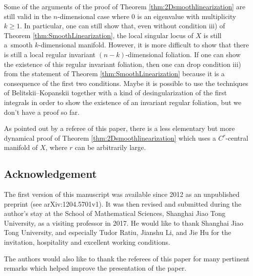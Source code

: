 \documentclass[pdftex]{sigma}
\numberwithin{equation}{section}
\begin{document}
\begin{Remark}
Some of the arguments of the proof of Theorem \ref{thm:2Dsmoothlinearization} are still valid in the $n$-dimensional
case where 0 is an eigenvalue with multiplicity $k \geq 1$. In particular, one can still show that, even without condition iii)
of Theorem \ref{thm:SmoothLinearization}, the local singular locus of $X$ is still a~smooth $k$-dimensional manifold. However,
it is more dif\/f\/icult to show that there is still a local regular invariant $(n-k)$-dimensional foliation. If one can show the existence
of this regular invariant foliation, then one can drop condition iii) from the statement of
Theorem \ref{thm:SmoothLinearization} because it is a consequence of the f\/irst two conditions. Maybe it is possible to use
 the techniques of Belitskii--Kopanskii \cite{BK-Equivariant2002} together with a kind of desingularization of the f\/irst
integrals in order to show the existence of an invariant regular foliation, but we don't have a proof so far.
\end{Remark}

\begin{Remark}
As pointed out by a referee of this paper, there is a less elementary but more
dynamical proof of Theorem \ref{thm:2Dsmoothlinearization} which uses a
$C^r$-central manifold of $X$, where $r$ can be arbitrarily large.
\end{Remark}

\subsection*{Acknowledgement}

The f\/irst version of this manuscript was available since 2012 as an unpublished
preprint (see arXiv:1204.5701v1). It was then revised and submitted during
the author's stay at the School of
Mathematical Sciences, Shanghai Jiao Tong University, as a visiting
professor in 2017. He would like to thank Shanghai Jiao Tong University, and
especially Tudor Ratiu, Jianshu Li, and Jie Hu for the invitation,
hospitality and excellent working conditions.

The authors would also like to thank the referees of this paper for many
pertinent remarks which helped improve the presentation of the paper.
\end{document}
